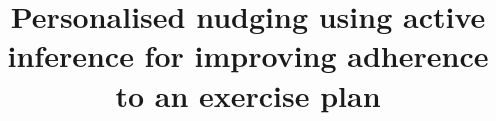 \documentclass[manuscript,screen,review]{acmart}
\begin{document}
\title{Personalised nudging using active inference for improving adherence to an exercise plan}








\end{document}
